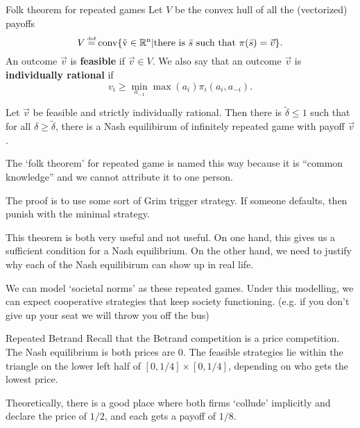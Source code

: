 \begin{atheorem}{Folk theorem for repeated games}{}
    Let $V$ be the convex hull of all the (vectorized) payoffs\[
    V\defeq \rm{conv}\{\vec{v}\in \reals^n | \textrm{there is $\bar{s}$ such that $\pi(\bar{s})=\vec{v}$}\}.
    \]
    An outcome $\vec{v}$ is \textbf{feasible} if $\vec{v}\in V$.
    We also say that an outcome $\vec{v}$ is \textbf{individually rational} if \[
    v_i \geq \min_{a_{-1}}\max(a_i) \pi_i(a_i,a_{-i}).
    \]

    Let $\vec{v}$ be feasible and strictly individually rational. Then there is $\tilde{\delta}\leq 1$ such that for all $\delta\geq\tilde{\delta}$, there is a Nash equilibirum of infinitely repeated game with payoff $\vec{v}$.
\end{atheorem}
\begin{remark}
    The `folk theorem' for repeated game is named this way because it is ``common knowledge'' and we cannot attribute it to one person.
\end{remark}

The proof is to use some sort of Grim trigger strategy. If someone defaults, then punish with the minimal strategy.

This theorem is both very useful and not useful. On one hand, this gives us a sufficient condition for a Nash equilibrium. On the other hand, we need to justify why each of the Nash equilibirum can show up in real life.

We can model `societal norms' as these repeated games. Under this modelling, we can expect cooperative strategies that keep society functioning. (e.g. if you don't give up your seat we will throw you off the bus)

\begin{aexample}{Repeated Betrand}{}
    Recall that the Betrand competition is a price competition. The Nash equilibrium is both prices are $0$. The feasible strategies lie within the triangle on the lower left half of $[0,1/4]\times [0,1/4]$, depending on who gets the lowest price.

    Theoretically, there is a good place where both firms `collude' implicitly and declare the price of $1/2$, and each gets a payoff of $1/8$. 
\end{aexample}